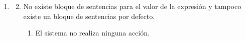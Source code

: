 \begin{framed}
\begin{description}
\begin{enumerate}
   \end{enumerate}
   \begin{enumerate} \itemsep1pt \parskip0pt 
   \setcounter{enumi}{2}
   \renewcommand{\labelenumi}{}
   \renewcommand{\labelenumiii}{\arabic{enumiii}.}
   \renewcommand{\labelenumii}{\arabic{enumi}\alph{enumii}.}
      \item 
      \begin {enumerate}
         \setcounter{enumii}{1}
         \item No existe bloque de sentencias para el valor de la expresión y 
         tampoco existe un bloque de sentencias por defecto.
         \begin{enumerate}
         \item El sistema no realiza ninguna acción.
         \end{enumerate}
      \end{enumerate}
   \end{enumerate}
\end{description}
 \FloatBarrier
\end{framed}
